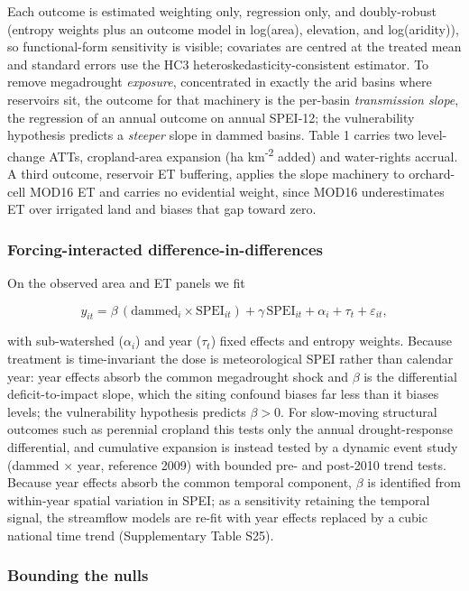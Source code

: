 \documentclass[
]{agujournal2019}
\begin{document}
Each outcome is estimated weighting only, regression only, and
doubly-robust (entropy weights plus an outcome model in log(area),
elevation, and log(aridity)), so functional-form sensitivity is visible;
covariates are centred at the treated mean and standard errors use the
HC3 heteroskedasticity-consistent estimator. To remove megadrought
\emph{exposure}, concentrated in exactly the arid basins where
reservoirs sit, the outcome for that machinery is the per-basin
\emph{transmission slope}, the regression of an annual outcome on annual
SPEI-12; the vulnerability hypothesis predicts a \emph{steeper} slope in
dammed basins. Table 1 carries two level-change ATTs, cropland-area
expansion (ha km\textsuperscript{-2} added) and water-rights accrual. A
third outcome, reservoir ET buffering, applies the slope machinery to
orchard-cell MOD16 ET and carries no evidential weight, since MOD16
underestimates ET over irrigated land and biases that gap toward zero.

\subsubsection{Forcing-interacted
difference-in-differences}\label{forcing-interacted-difference-in-differences}

On the observed area and ET panels we fit

\[
y_{it} = \beta\,(\text{dammed}_i \times \text{SPEI}_{it}) + \gamma\,\text{SPEI}_{it}
         + \alpha_i + \tau_t + \varepsilon_{it},
\]

with sub-watershed (\(\alpha_i\)) and year (\(\tau_t\)) fixed effects
and entropy weights. Because treatment is time-invariant the dose is
meteorological SPEI rather than calendar year: year effects absorb the
common megadrought shock and \(\beta\) is the differential
deficit-to-impact slope, which the siting confound biases far less than
it biases levels; the vulnerability hypothesis predicts \(\beta > 0\).
For slow-moving structural outcomes such as perennial cropland this
tests only the annual drought-response differential, and cumulative
expansion is instead tested by a dynamic event study (dammed × year,
reference 2009) with bounded pre- and post-2010 trend tests. Because
year effects absorb the common temporal component, \(\beta\) is
identified from within-year spatial variation in SPEI; as a sensitivity
retaining the temporal signal, the streamflow models are re-fit with
year effects replaced by a cubic national time trend (Supplementary
Table S25).

\subsubsection{Bounding the nulls}\label{bounding-the-nulls}
\end{document}

